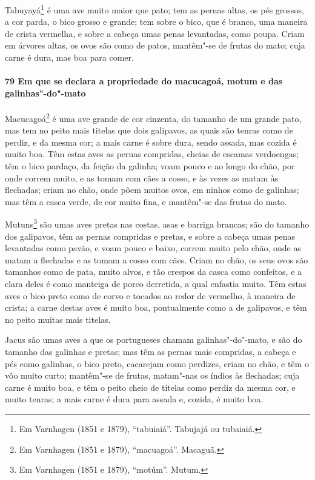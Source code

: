 Tabuyayá\footnote{ Em Varnhagen (1851 e 1879), ``tabuiaiá''. Tabujajá ou tubaiaiá.} é uma
ave muito maior que pato; tem as pernas altas, os pés grossos, a cor parda, o bico grosso
e grande; tem sobre o bico, que é branco, uma maneira de crista vermelha, e sobre a cabeça
umas penas levantadas, como poupa. Criam em árvores altas, os ovos são como de patos,
mantêm"-se de frutas do mato; cuja carne é dura, mas boa para comer.

\paragraph{79 Em que se declara a propriedade do macucagoá, motum e das galinhas"-do"-mato}

Macucagoá\footnote{ Em Varnhagen (1851 e 1879), ``macuagoá''. Macaguã.} é uma ave grande
de cor cinzenta, do tamanho de um grande pato, mas tem no peito mais titelas que dois
galipavos, as quais são tenras como de perdiz, e da mesma cor; a mais carne é sobre dura,
sendo assada, mas cozida é muito boa. Têm estas aves as
pernas compridas, cheias de escamas verdoengas; têm o bico pardaço, da feição da galinha;
voam pouco e ao longo do chão, por onde correm muito, e as tomam com cães a cosso, e às
vezes as matam às flechadas; criam no chão, onde põem muitos ovos, em ninhos como de
galinhas; mas têm a casca verde, de cor muito fina, e mantêm"-se das frutas do mato.

Mutuns\footnote{ Em Varnhagen (1851 e 1879), ``motúm''. Mutum.} são umas aves pretas nas
costas, asas e barriga brancas; são do tamanho dos galipavos, têm as pernas compridas e
pretas, e sobre a cabeça umas penas levantadas como pavão, e voam pouco e baixo, correm
muito pelo chão, onde as matam a flechadas e as tomam a cosso com cães. Criam no chão, os
seus ovos são tamanhos como de pata, muito alvos, e tão crespos da casca como confeitos, e
a clara deles é como manteiga de porco derretida, a qual enfastia muito. Têm estas aves o
bico preto como de corvo e tocados ao redor de vermelho, à maneira de crista; a carne
destas aves é muito boa, pontualmente como a de galipavos, e têm no peito muitas mais
titelas.

Jacus são umas aves a que os portugueses chamam galinhas"-do"-mato, e são do tamanho das
galinhas e pretas; mas têm as pernas mais compridas, a cabeça e pés como galinhas, o bico
preto, cacarejam como perdizes, criam no chão, e têm o vôo muito curto; mantêm"-se de
frutas, matam"-nas os índios às flechadas; cuja carne é muito boa, e têm o peito cheio de
titelas como perdiz da mesma cor, e muito tenras; a mais carne é dura para assada e,
cozida, é muito boa.

